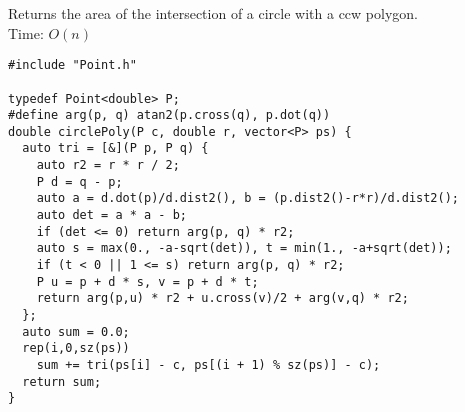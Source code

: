 Returns the area of the intersection of a circle with a ccw polygon. \\
Time: $O(n)$
\begin{verbatim}
#include "Point.h"

typedef Point<double> P;
#define arg(p, q) atan2(p.cross(q), p.dot(q))
double circlePoly(P c, double r, vector<P> ps) {
  auto tri = [&](P p, P q) {
    auto r2 = r * r / 2;
    P d = q - p;
    auto a = d.dot(p)/d.dist2(), b = (p.dist2()-r*r)/d.dist2();
    auto det = a * a - b;
    if (det <= 0) return arg(p, q) * r2;
    auto s = max(0., -a-sqrt(det)), t = min(1., -a+sqrt(det));
    if (t < 0 || 1 <= s) return arg(p, q) * r2;
    P u = p + d * s, v = p + d * t;
    return arg(p,u) * r2 + u.cross(v)/2 + arg(v,q) * r2;
  };
  auto sum = 0.0;
  rep(i,0,sz(ps))
    sum += tri(ps[i] - c, ps[(i + 1) % sz(ps)] - c);
  return sum;
}
\end{verbatim}
